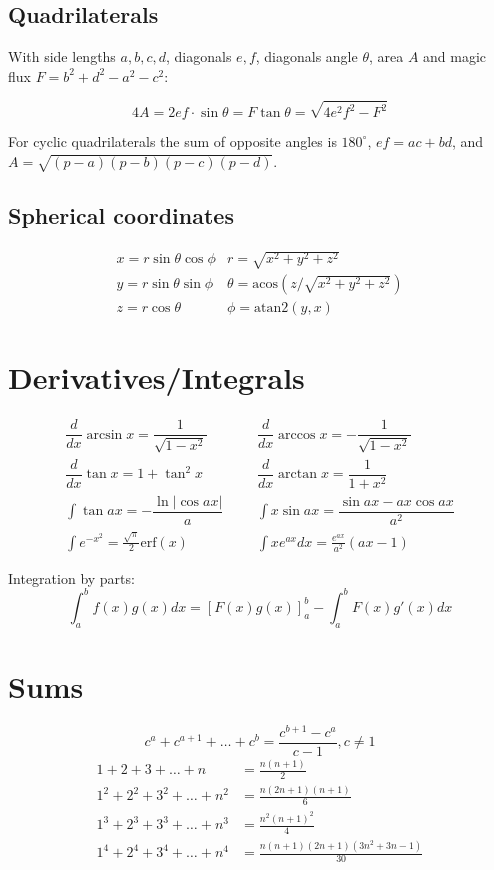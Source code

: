\documentclass[11pt]{article}
\begin{document}
\begin{multicols}{3}
\subsection{Quadrilaterals}
With side lengths $a,b,c,d$, diagonals $e, f$, diagonals angle $\theta$, area $A$ and
magic flux $F=b^2+d^2-a^2-c^2$:

\[ 4A = 2ef \cdot \sin\theta = F\tan\theta = \sqrt{4e^2f^2-F^2} \]

 For cyclic quadrilaterals the sum of opposite angles is $180^\circ$,
$ef = ac + bd$, and $A = \sqrt{(p-a)(p-b)(p-c)(p-d)}$.

\subsection{Spherical coordinates}
\[\begin{array}{cc}
x = r\sin\theta\cos\phi & r = \sqrt{x^2+y^2+z^2}\\
y = r\sin\theta\sin\phi & \theta = \textrm{acos}(z/\sqrt{x^2+y^2+z^2})\\
z = r\cos\theta & \phi = \textrm{atan2}(y,x)
\end{array}\]

\section{Derivatives/Integrals}
\begin{align*}
	\dfrac{d}{dx}\arcsin x = \dfrac{1}{\sqrt{1-x^2}} &&& \dfrac{d}{dx}\arccos x = -\dfrac{1}{\sqrt{1-x^2}} \\
	\dfrac{d}{dx}\tan x = 1+\tan^2 x &&& \dfrac{d}{dx}\arctan x = \dfrac{1}{1+x^2} \\
	\int\tan ax = -\dfrac{\ln|\cos ax|}{a} &&& \int x\sin ax = \dfrac{\sin ax-ax \cos ax}{a^2} \\
	\int e^{-x^2} = \frac{\sqrt \pi}{2} \text{erf}(x) &&& \int xe^{ax}dx = \frac{e^{ax}}{a^2}(ax-1)
\end{align*}

Integration by parts:
\[\int_a^bf(x)g(x)dx = [F(x)g(x)]_a^b-\int_a^bF(x)g'(x)dx\]

\section{Sums}
\[ c^a + c^{a+1} + \dots + c^{b} = \frac{c^{b+1} - c^a}{c-1}, c \neq 1 \]
\begin{align*}
	1 + 2 + 3 + \dots + n &= \frac{n(n+1)}{2} \\
	1^2 + 2^2 + 3^2 + \dots + n^2 &= \frac{n(2n+1)(n+1)}{6} \\
	1^3 + 2^3 + 3^3 + \dots + n^3 &= \frac{n^2(n+1)^2}{4} \\
	1^4 + 2^4 + 3^4 + \dots + n^4 &= \frac{n(n+1)(2n+1)(3n^2 + 3n - 1)}{30} \\
\end{align*}


\end{multicols}
\end{document}
